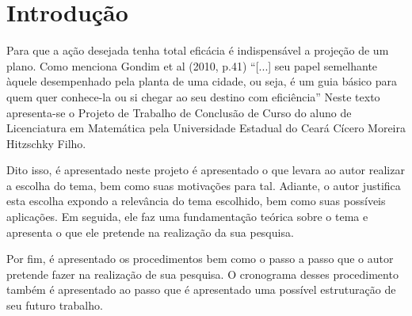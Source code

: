 




\chapter{Introdução}
    Para que a ação desejada tenha total eficácia é indispensável a projeção de um plano. 
    Como menciona Gondim et al (2010, p.41) 
    \enquote{[...] seu papel  semelhante àquele desempenhado pela planta de uma cidade, ou seja, é um guia básico para quem quer conhece-la ou si chegar ao seu destino com eficiência}
    Neste texto apresenta-se o Projeto de Trabalho de Conclusão de Curso do aluno de Licenciatura em Matemática pela Universidade Estadual do Ceará Cícero Moreira Hitzschky Filho.

    Dito isso, é apresentado neste projeto é apresentado o que levara ao autor realizar a escolha do tema, bem como suas motivações para tal.
    Adiante, o autor justifica esta escolha expondo a relevância do tema escolhido, bem como suas possíveis aplicações.
    Em seguida, ele faz uma fundamentação teórica sobre o tema e apresenta o que ele pretende na realização da sua pesquisa.

    Por fim, é apresentado os procedimentos bem como o passo a passo que o autor pretende fazer na realização de sua pesquisa.
    O cronograma desses procedimento também é apresentado ao passo que é apresentado uma possível estruturação de seu futuro trabalho.